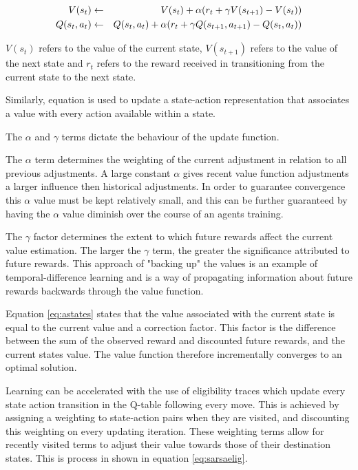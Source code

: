 \documentclass{rucsthesis}
\begin{document}
\begin{eqnarray}
\centering
V(s_t) & \leftarrow & V(s_t) + \alpha(r_{t} + \gamma V(s_{t+1}) - V(s_t)) \label{eq:astates} \\
Q(s_t,a_t) & \leftarrow & Q(s_t,a_t) + \alpha(r_{t} + \gamma Q(s_{t+1},a_{t+1}) - Q(s_t,a_t)) \label{eq:sarsa} \\
\end{eqnarray}

$V(s_t)$ refers to the value of the current state, $V(s_{t+1})$ refers to the value of the next state and $r_t$ refers to the reward received in transitioning from the current state to the next state.

Similarly, equation \label{eq:sarsa} is used to update a state-action representation that associates a value with every action available within a state. 

The $\alpha$ and $\gamma$ terms dictate the behaviour of the update function. 

The $\alpha$ term determines the weighting of the current adjustment in relation to all previous adjustments. A large constant $\alpha$ gives recent value function adjustments a larger influence then historical adjustments. In order to guarantee convergence this $\alpha$ value must be kept relatively small, and this can be further guaranteed by having the $\alpha$ value diminish over the course of an agents training. 

The $\gamma$ factor determines the extent to which future rewards affect the current value estimation. The larger the $\gamma$ term, the greater the significance attributed to future rewards. This approach of "backing up" the values is an example of temporal-difference learning\citep{suttonbarto} and is a way of propagating information about future rewards backwards through the value function.

Equation \ref{eq:astates} states that the value associated with the current state is equal to the current value and a correction factor. This factor is the difference between the sum of the observed reward and discounted future rewards, and the current states value. The value function therefore incrementally converges to an optimal solution.

Learning can be accelerated with the use of eligibility traces which update every state action transition in the Q-table following every move. This is achieved by assigning a weighting to state-action pairs when they are visited, and discounting this weighting on every updating iteration. These weighting terms allow for recently visited terms to adjust their value towards those of their destination states. This is process in shown in equation \ref{eq:sarsaelig}.
\end{document}
